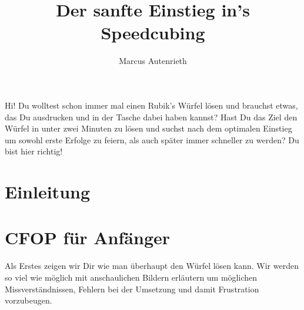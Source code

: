 \documentclass[11pt, a5paper]{scrbook}
\title{Der sanfte Einstieg in's Speedcubing}
\author{Marcus Autenrieth}
\begin{document}
\maketitle

Hi! Du wolltest schon immer mal einen Rubik's Würfel lösen und brauchst etwas, das Du ausdrucken und in der Tasche dabei haben kannst?
Hast Du das Ziel den Würfel in unter zwei Minuten zu lösen und suchst nach dem optimalen Einstieg um sowohl erste Erfolge zu feiern, als auch später immer schneller zu werden?
Du bist hier richtig!

\tableofcontents

\chapter{Einleitung}


\chapter{CFOP für Anfänger}
Als Erstes zeigen wir Dir wie man überhaupt den Würfel lösen kann. Wir werden so viel wie möglich
mit anschaulichen Bildern erläutern um möglichen Missverständnissen, Fehlern bei der Umsetzung
und damit Frustration vorzubeugen.











%
%
%
%
%
%
%
%
%
%
%
%
\end{document}
